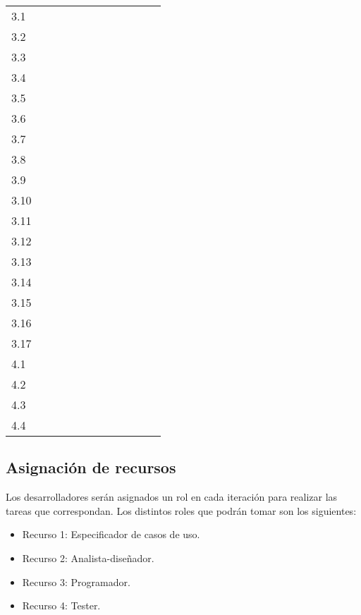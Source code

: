 {\begin{longtable}[c]{l|rrr|rrr|rrr|rr|}
3.1 & & & & \cellcolor[gray]{0.25} & & & & & & & \\
3.2 & & & & \cellcolor[gray]{0.25} & & & & & & & \\
3.3 & & & & & & \cellcolor[gray]{0.25} & & & & & \\
3.4 & & & & & \cellcolor[gray]{0.25} & & & & & & \\
3.5 & & & & & & \cellcolor[gray]{0.25} & & & & & \\
3.6 & & & & & & \cellcolor[gray]{0.25} & \cellcolor[gray]{0.25} & & & & \\
3.7 & & & & & & & & & & \cellcolor[gray]{0.25} & \\
3.8 & & & & & \cellcolor[gray]{0.25} & & & & & & \\
3.9 & & & & & & \cellcolor[gray]{0.25} & & & & & \\
3.10 & & & & & & & & \cellcolor[gray]{0.25} & & & \\
3.11 & & & & & & & & & \cellcolor[gray]{0.25} & & \\
3.12 & & & & & & & \cellcolor[gray]{0.25} & & & & \\
3.13 & & & & & & & & & & \cellcolor[gray]{0.25} & \\
3.14 & & & & & & & & & & \cellcolor[gray]{0.25} & \\
3.15 & & & & & & & & & & \cellcolor[gray]{0.25} & \\
3.16 & & & & & & & & & \cellcolor[gray]{0.25} & & \\
3.17 & & & & & & & & & \cellcolor[gray]{0.25} & & \\
\hline

4.1 & & & & & & \cellcolor[gray]{0.25} & & & & & \\
4.2 & & & & & & & \cellcolor[gray]{0.25} & \cellcolor[gray]{0.25} & & & \\
4.3 & & & & & & & & \cellcolor[gray]{0.25} & \cellcolor[gray]{0.25} & & \\
4.4 & & & & & & & & & \cellcolor[gray]{0.25} & \cellcolor[gray]{0.25} &
\cellcolor[gray]{0.25} \\
\hline
\end{longtable}
}

\subsection{Asignación de recursos}

Los desarrolladores serán asignados un rol en cada iteración para realizar las
tareas que correspondan. Los distintos roles que podrán tomar son los
siguientes:
\begin{itemize}
\item Recurso 1: Especificador de casos de uso.
\item Recurso 2: Analista-diseñador.
\item Recurso 3: Programador.
\item Recurso 4: Tester.
\end{itemize}


